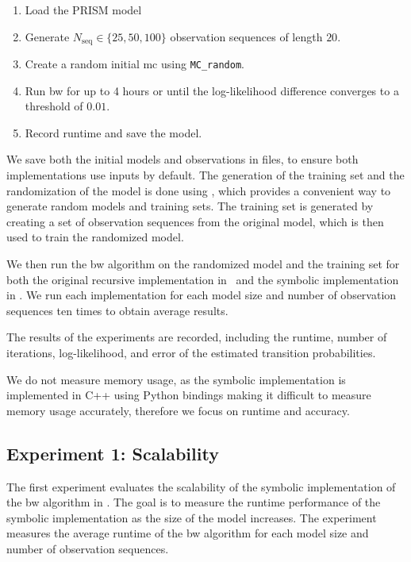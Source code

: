 \begin{enumerate}
    \item Load the PRISM model
    \item Generate $N_\text{seq}\in\{25,50,100\}$ observation sequences of length $20$.
    \item Create a random initial \gls{mc} using \texttt{MC\_random}.
    \item Run \gls{bw} for up to 4 hours or until the log-likelihood difference converges to a threshold of $0.01$.
    \item Record runtime and save the model.
\end{enumerate}


We save both the initial models and observations in files, to ensure both implementations use inputs by default.
The generation of the training set and the randomization of the model is done using \Jajapy, which provides a convenient way to generate random models and training sets.
The training set is generated by creating a set of observation sequences from the original model, which is then used to train the randomized model.

We then run the \gls{bw} algorithm on the randomized model and the training set for both the original recursive implementation in \Jajapy\ and the symbolic implementation in \JajapyTwo.
We run each implementation for each model size and number of observation sequences ten times to obtain average results.

The results of the experiments are recorded, including the runtime, number of iterations, log-likelihood, and error of the estimated transition probabilities.

We do not measure memory usage, as the symbolic implementation is implemented in C++ using Python bindings making it difficult to measure memory usage accurately, therefore we focus on runtime and accuracy.

\subsection{Experiment 1: Scalability}\label{sec:exp_scalability}
The first experiment evaluates the scalability of the symbolic implementation of the \gls{bw} algorithm in \JajapyTwo.
The goal is to measure the runtime performance of the symbolic implementation as the size of the model increases.
The experiment measures the average runtime of the \gls{bw} algorithm for each model size and number of observation sequences.

